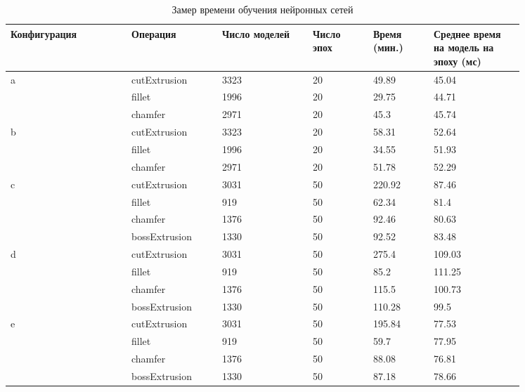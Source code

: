 \begin{table}[h]
\centering
\small
\begin{tabular}{|p{0.2\linewidth}|p{0.15\linewidth}|p{0.15\linewidth}|p{0.1\linewidth}|p{0.1\linewidth}|p{0.15\linewidth}|}
\hline
Конфигурация & Операция & Число моделей & Число эпох & Время (мин.) & Среднее время на модель на эпоху (мс) \\
\hline
\multirow{3}{*}{a} & cutExtrusion  & 3323 & 20 & 49.89  & 45.04  \\
                   & fillet        & 1996 & 20 & 29.75  & 44.71 \\
                   & chamfer       & 2971 & 20 & 45.3   & 45.74 \\
\hline
\multirow{3}{*}{b} & cutExtrusion  & 3323 & 20 & 58.31  & 52.64 \\
                   & fillet        & 1996 & 20 & 34.55  & 51.93 \\
                   & chamfer       & 2971 & 20 & 51.78  & 52.29 \\
\hline
\multirow{3}{*}{c} & cutExtrusion  & 3031 & 50 & 220.92 & 87.46 \\
                   & fillet        & 919  & 50 & 62.34  & 81.4 \\
                   & chamfer       & 1376 & 50 & 92.46  & 80.63 \\
                   & bossExtrusion & 1330 & 50 & 92.52  & 83.48 \\
\hline
\multirow{3}{*}{d} & cutExtrusion  & 3031 & 50 & 275.4  & 109.03 \\
                   & fillet        & 919  & 50 & 85.2   & 111.25 \\
                   & chamfer       & 1376 & 50 & 115.5  & 100.73 \\
                   & bossExtrusion & 1330 & 50 & 110.28 & 99.5 \\
\hline
\multirow{3}{*}{e} & cutExtrusion  & 3031 & 50 & 195.84 & 77.53 \\
                   & fillet        & 919  & 50 & 59.7   & 77.95 \\
                   & chamfer       & 1376 & 50 & 88.08  & 76.81 \\
                   & bossExtrusion & 1330 & 50 & 87.18  & 78.66 \\
\hline
\end{tabular}
\caption{Замер времени обучения нейронных сетей}
\label{tab:time-train}
\end{table}



